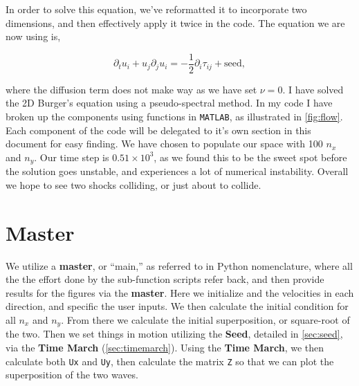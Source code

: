 \documentclass[12pt,twoside]{article}
\begin{document}
In order to solve this equation, we've reformatted it to incorporate two dimensions, and then effectively apply it twice in the code. The equation we are now using is,

$$ \partial_{t}u_{i} + u_{j}\partial_{j}u_{i} = -\frac{1}{2}\partial_{i}\tau_{ij} + \mathrm{seed},$$

\noindent where the diffusion term does not make way as we have set $\nu=0$. I have solved the 2D Burger's equation using a pseudo-spectral method. In my code I have broken up the components using functions in \texttt{MATLAB}, as illustrated in \ref{fig:flow}. Each component of the code will be delegated to it's own section in this document for easy finding. We have chosen to populate our space with 100 $n_{x}$ and $n_{y}$. Our time step is $0.51\times10^{3}$, as we found this to be the sweet spot before the solution goes unstable, and experiences a lot of numerical instability. Overall we hope to see two shocks colliding, or just about to collide.   

\newpage

\section{Master} \label{sec:master}

We utilize a \textbf{master}, or ``main,'' as referred to in Python nomenclature, where all the the effort done by the sub-function scripts refer back, and then provide results for the figures via the \textbf{master}. Here we initialize and the velocities in each direction, and specific the user inputs. We then calculate the initial condition for all $n_{x}$ and $n_{y}$. From there we calculate the initial superposition, or square-root of the two. Then we set things in motion utilizing the \textbf{Seed}, detailed in \ref{sec:seed}, via the \textbf{Time March} (\ref{sec:timemarch}). Using the \textbf{Time March}, we then calculate both \texttt{Ux} and \texttt{Uy}, then calculate the matrix \texttt{Z} so that we can plot the superposition of the two waves.

\vspace{50pt}
\end{document}
